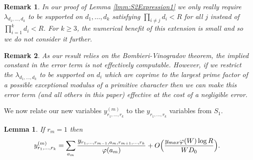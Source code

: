 \documentclass[12pt,a4paper]{amsart}
\theoremstyle{plain}
\newtheorem{lmm}[thrm]{Lemma}
\newtheorem*{rmk}{Remark}
\numberwithin{sblmm}{thrm}
\numberwithin{equation}{section}
\renewcommand{\phi}{\varphi}
\begin{document}
\begin{rmk}
In our proof of Lemma \ref{lmm:S2Expression1} we only really require $\lambda_{d_1,\dotsc,d_k}$ to be supported on $d_1,\dotsc,d_k$ satisfying $\prod_{i\ne j}d_i<R$ for all $j$ instead of $\prod_{i=1}^kd_i<R$. For $k\ge 3$, the numerical benefit of this extension is small and so we do not consider it further.
\end{rmk}
\begin{rmk}
As our result relies on the Bombieri-Vinogradov theorem, the implied constant in the error term is not effectively computable. However, if we restrict the $\lambda_{d_1,\dotsc,d_k}$ to be supported on $d_i$ which are coprime to the largest prime factor of a possible exceptional modulus of a primitive character then we can make this error term (and all others in this paper) effective at the cost of a negligible error.
\end{rmk}
We now relate our new variables $y^{(m)}_{r_1,\dotsc,r_{k}}$ to the $y_{r_1,\dotsc,r_k}$ variables from $S_1$.
\begin{lmm}\label{lmm:YjExpression}
If $r_m=1$ then
\[y^{(m)}_{r_1,\dotsc,r_k}=\sum_{a_m}\frac{y_{r_1,\dotsc,r_{m-1},a_m,r_{m+1},\dotsc,r_k}}{\phi(a_m)}+O\Bigl(\frac{y_{max} \phi(W) \log{R}}{W D_0}\Bigr).\]
\end{lmm}
\end{document}
